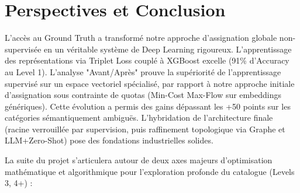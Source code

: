 \documentclass[11pt,a4paper]{article}
\begin{document}
\section{Perspectives et Conclusion}

L'accès au Ground Truth a transformé notre approche d'assignation globale non-supervisée en un véritable système de Deep Learning rigoureux. L'apprentissage des représentations via Triplet Loss couplé à XGBoost excelle (91\% d'Accuracy au Level 1). L'analyse "Avant/Après" prouve la supériorité de l'apprentissage supervisé sur un espace vectoriel spécialisé, par rapport à notre approche initiale d'assignation sous contrainte de quotas (Min-Cost Max-Flow sur embeddings génériques). Cette évolution a permis des gains dépassant les +50 points sur les catégories sémantiquement ambiguës. L'hybridation de l'architecture finale (racine verrouillée par supervision, puis raffinement topologique via Graphe et LLM+Zero-Shot) pose des fondations industrielles solides.

La suite du projet s'articulera autour de deux axes majeurs d'optimisation mathématique et algorithmique pour l'exploration profonde du catalogue (Levels 3, 4+) :
\end{document}
